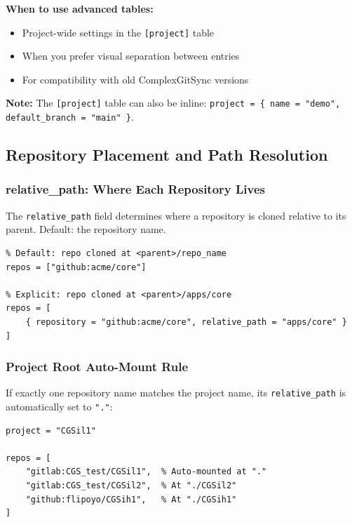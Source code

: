 \textbf{When to use advanced tables:}

\begin{itemize}
  \item Project-wide settings in the \texttt{[project]} table
  \item When you prefer visual separation between entries
  \item For compatibility with old ComplexGitSync versions
\end{itemize}

\textbf{Note:} The \texttt{[project]} table can also be inline:
\texttt{project = \{ name = "demo", default\_branch = "main" \}}.

\subsection{Repository Placement and Path Resolution}
\label{subsec:cgs-placement}

\subsubsection{relative\_path: Where Each Repository Lives}

The \texttt{relative\_path} field determines where a repository is cloned relative
to its parent. Default: the repository name.

\begin{lstlisting}
% Default: repo cloned at <parent>/repo_name
repos = ["github:acme/core"]

% Explicit: repo cloned at <parent>/apps/core
repos = [
    { repository = "github:acme/core", relative_path = "apps/core" }
]
\end{lstlisting}

\subsubsection{Project Root Auto-Mount Rule}

If exactly one repository name matches the project name, its
\texttt{relative\_path} is automatically set to \texttt{"."}:

\begin{lstlisting}
project = "CGSil1"

repos = [
    "gitlab:CGS_test/CGSil1",  % Auto-mounted at "."
    "gitlab:CGS_test/CGSil2",  % At "./CGSil2"
    "github:flipoyo/CGSih1",   % At "./CGSih1"
]
\end{lstlisting}


